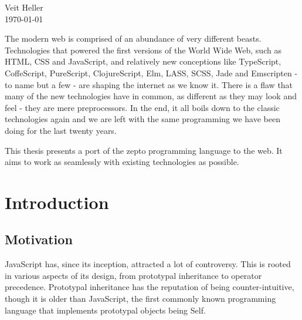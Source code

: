 \documentclass[oneside,11pt,xetex]{scrbook}
\begin{document}
\begin{flushright}
  \begin{minipage}{4cm}
    Veit Heller\\
    \today
  \end{minipage}
\end{flushright}

\begin{onehalfspace}


The modern web is comprised of an abundance of very different beasts. Technologies that powered the first versions of the World Wide Web, such as HTML, CSS and JavaScript, and relatively new conceptions like TypeScript, CoffeScript, PureScript, ClojureScript, Elm, LASS, SCSS, Jade and Emscripten - to name but a few - are shaping the internet as we know it. There is a flaw that many of the new technologies have in common, as different as they may look and feel - they are mere preprocessors. In the end, it all boils down to the classic technologies again and we are left with the same programming we have been doing for the last twenty years.

This thesis presents a port of the zepto programming language to the web. It aims to work as seamlessly with existing technologies as possible.

\tableofcontents

\printglossary[type=\acronymtype,title=Abbreviations]

\mainmatter

\pagestyle{headings}

\chapter{Introduction}
\label{chap:intro}

\section{Motivation}

JavaScript has, since its inception, attracted a lot of controversy. This is rooted
in various aspects of its design, from prototypal inheritance to operator precedence.
Prototypal inheritance has the reputation of being counter-intuitive, though it is older
than JavaScript, the first commonly known programming language that implements prototypal
objects being Self.



\end{onehalfspace}
\end{document}
